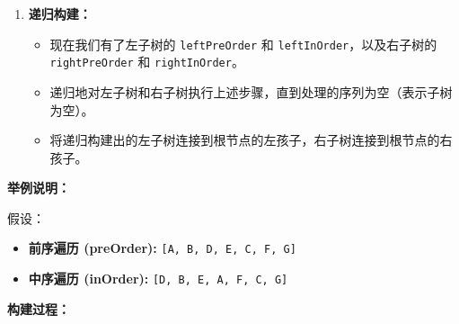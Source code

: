 \begin{enumerate}
\begin{itemize}
\begin{itemize}
		\end{itemize}
	\end{itemize}
	\item \textbf{递归构建：}
	\begin{itemize}
		\item 现在我们有了左子树的 \lstinline{leftPreOrder} 和 \lstinline{leftInOrder}，以及右子树的 \lstinline{rightPreOrder} 和 \lstinline{rightInOrder}。
		\item 递归地对左子树和右子树执行上述步骤，直到处理的序列为空（表示子树为空）。
		\item 将递归构建出的左子树连接到根节点的左孩子，右子树连接到根节点的右孩子。
	\end{itemize}
\end{enumerate}

\textbf{举例说明：}

假设：

\begin{itemize}
	\item \textbf{前序遍历 (preOrder):} \lstinline{[A, B, D, E, C, F, G]}
	\item \textbf{中序遍历 (inOrder):} \lstinline{[D, B, E, A, F, C, G]}
\end{itemize}

\textbf{构建过程：}

